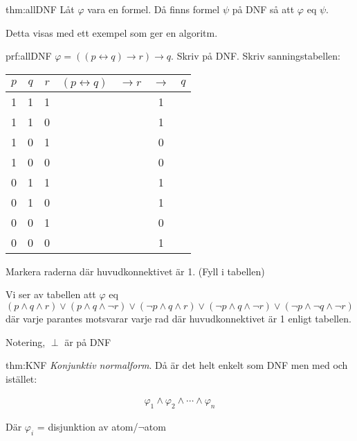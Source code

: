 \begin{theo}{thm:allDNF}
  Låt $\varphi$ vara en formel. Då finns formel $\psi$ på DNF så att $\varphi$ eq $\psi$.
\end{theo}
\par\bigskip
\noindent Detta visas med ett exempel som ger en algoritm.
\par\bigskip
\begin{prf}{prf:allDNF}
  $\varphi=((p\leftrightarrow q)\rightarrow r)\rightarrow q$. Skriv på DNF. Skriv sanningstabellen:
  \par\bigskip

  \begin{center}
    \begin{tabular}{|c|c|c|c|c|c|c|}
      \hline
      $p$&$q$&$r$&$(p\leftrightarrow q)$&$\rightarrow r$&$\rightarrow$&$q$\\
      \hline
      1&1&1&&&1&\\
      \hline
      1&1&0&&&1&\\
      \hline
      1&0&1&&&0&\\
      \hline
      1&0&0&&&0&\\
      \hline
      0&1&1&&&1&\\
      \hline
      0&1&0&&&1&\\
      \hline
      0&0&1&&&0&\\
      \hline
      0&0&0&&&1&\\
      \hline

    \end{tabular}
  \end{center}
  \par\bigskip
  \noindent Markera raderna där huvudkonnektivet är 1. (Fyll i tabellen)
  \par\bigskip
  \noindent Vi ser av tabellen att $\varphi$ eq $(p\wedge q\wedge r)\vee(p\wedge q \wedge\neg r)\vee(\neg p\wedge q\wedge r)\vee(\neg p\wedge q\wedge\neg r)\vee(\neg p\wedge\neg q\wedge\neg r)$ där varje parantes motsvarar varje rad där huvudkonnektivet är 1 enligt tabellen.
  \par\bigskip
  \noindent Notering, $\perp$ är på DNF
\end{prf}
\par\bigskip
\begin{theo}[KNF]{thm:KNF}
  \textit{Konjunktiv normalform}. Då är det helt enkelt som DNF men med och istället:

  \begin{equation*}
    \begin{gathered}
      \varphi_1\wedge\varphi_2\wedge\cdots\wedge\varphi_n
    \end{gathered}
  \end{equation*}
  \par\bigskip
  \noindent Där $\varphi_i$ = disjunktion av atom/$\neg$atom
\end{theo}
\par\bigskip

